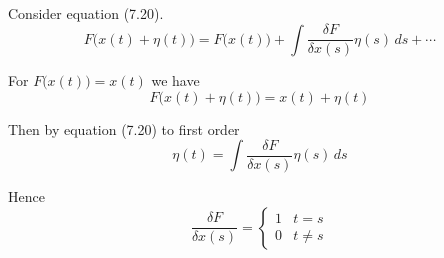 


Consider equation (7.20).
\begin{equation*}
F\big(x(t)+\eta(t)\big)=F\big(x(t)\big)+\int\frac{\delta F}{\delta x(s)}\eta(s)\,ds+\cdots
\tag{7.20}
\end{equation*}

For $F\big(x(t)\big)=x(t)$ we have
\begin{equation*}
F\big(x(t)+\eta(t)\big)=x(t)+\eta(t)
\end{equation*}

Then by equation (7.20) to first order
\begin{equation*}
\eta(t)=\int\frac{\delta F}{\delta x(s)}\eta(s)\,ds
\end{equation*}

Hence
\begin{equation*}
\frac{\delta F}{\delta x(s)}=
\begin{cases}
1 & t=s
\\
0 & t\ne s
\end{cases}
\end{equation*}


